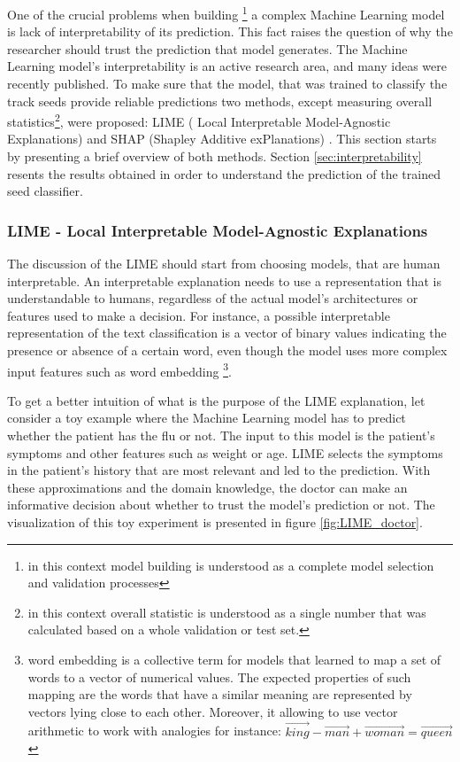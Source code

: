 One of the crucial problems when building \footnote{in this context model building is understood as a complete model selection and validation processes} a complex Machine Learning model is lack of interpretability of its prediction. This fact raises the question of why the researcher should trust the prediction that model generates. The Machine Learning model's interpretability is an active research area, and many ideas were recently published. To make sure that the model, that was trained to classify the track seeds provide reliable predictions two methods, except measuring overall statistics\footnote{in this context overall statistic is understood as a single number that was calculated based on a whole validation or test set.}, were proposed: LIME ( Local Interpretable Model-Agnostic Explanations) \cite{lime}  and SHAP (Shapley Additive exPlanations) \cite{shap}. This section starts by presenting a brief overview of both methods.  Section \ref{sec:interpretability} resents the results obtained in order to understand the prediction of the trained seed classifier.
\subsubsection{LIME - Local Interpretable Model-Agnostic Explanations }

The discussion of the LIME should start from choosing models, that are human interpretable. An interpretable explanation needs to use a representation that is understandable to humans, regardless of the actual model's architectures or features used to make a decision. For instance, a possible interpretable representation of the text classification is a vector of binary values indicating the presence or absence of a certain word, even though the model uses more complex input features such as word embedding
\footnote{word embedding is a collective term for models that learned to map a set of words to a vector of numerical values. The expected properties of such mapping are the words that have a similar meaning are represented by vectors lying close to each other. Moreover, it allowing to use vector arithmetic to work with analogies for instance: $\overrightarrow{king} - \overrightarrow{man} + \overrightarrow{woman}= \overrightarrow{queen}$}. 

To get a better intuition of what is the purpose of the LIME explanation, let consider a toy example where the Machine Learning model has to predict whether the patient has the flu or not. The input to this model is the patient's symptoms and other features such as weight or age. LIME selects the symptoms in the patient's history that are most relevant and led to the prediction. With these approximations and the domain knowledge, the doctor can make an informative decision about whether to trust the model's prediction or not. The visualization of this toy experiment is presented in figure \ref{fig:LIME_doctor}.


